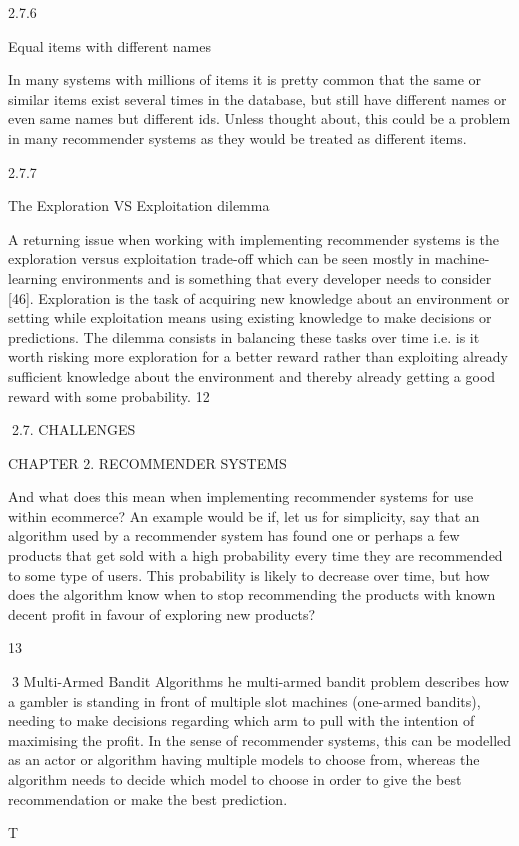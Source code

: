 2.7.6

Equal items with different names

In many systems with millions of items it is pretty common that the same or similar items
exist several times in the database, but still have different names or even same names
but different ids. Unless thought about, this could be a problem in many recommender
systems as they would be treated as different items.

2.7.7

The Exploration VS Exploitation dilemma

A returning issue when working with implementing recommender systems is the exploration versus exploitation trade-off which can be seen mostly in machine-learning
environments and is something that every developer needs to consider [46]. Exploration
is the task of acquiring new knowledge about an environment or setting while exploitation means using existing knowledge to make decisions or predictions. The dilemma
consists in balancing these tasks over time i.e. is it worth risking more exploration for a
better reward rather than exploiting already sufficient knowledge about the environment
and thereby already getting a good reward with some probability.
12

2.7. CHALLENGES

CHAPTER 2. RECOMMENDER SYSTEMS

And what does this mean when implementing recommender systems for use within ecommerce? An example would be if, let us for simplicity, say that an algorithm used by a
recommender system has found one or perhaps a few products that get sold with a high
probability every time they are recommended to some type of users. This probability
is likely to decrease over time, but how does the algorithm know when to stop recommending the products with known decent profit in favour of exploring new products?

13

3
Multi-Armed Bandit Algorithms
he multi-armed bandit problem describes how a gambler is standing in
front of multiple slot machines (one-armed bandits), needing to make decisions regarding which arm to pull with the intention of maximising the profit.
In the sense of recommender systems, this can be modelled as an actor or
algorithm having multiple models to choose from, whereas the algorithm needs to decide which model to choose in order to give the best recommendation or make the best
prediction.

T

